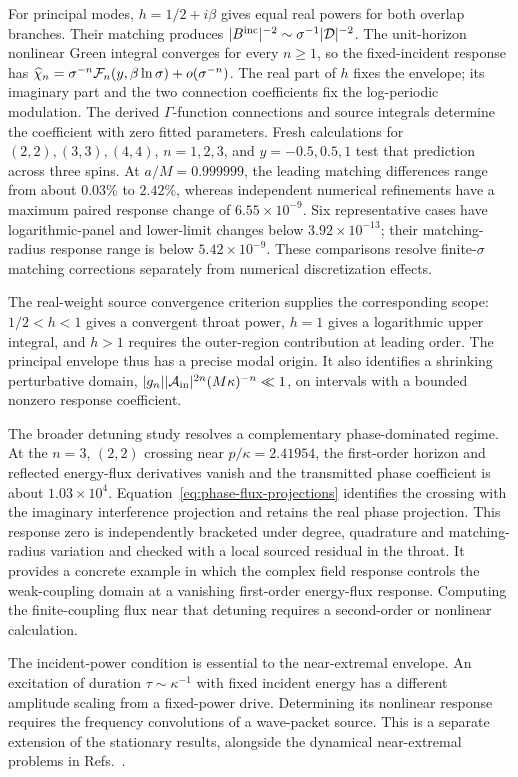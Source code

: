 \documentclass[aps,prd,twocolumn,10pt,nofootinbib,superscriptaddress,floatfix]{revtex4-2}
\begin{document}
For principal modes, $h=1/2+i\beta$ gives equal real powers for both overlap
branches.  Their matching produces $|B^{\rm inc}|^{-2}\sim\sigma^{-1}
|{\cal D}|^{-2}$.  The unit-horizon nonlinear Green integral converges for
every $n\ge1$, so the fixed-incident response has
$\widehat\chi_n=\sigma^{-n}{\cal F}_n(y,\beta\ln\sigma)+o(\sigma^{-n})$.
The real part of $h$ fixes the envelope; its imaginary part and the two
connection coefficients fix the log-periodic modulation.  The derived
$\Gamma$-function connections and source integrals determine the coefficient
with zero fitted parameters.  Fresh calculations for $(2,2),(3,3),(4,4)$,
$n=1,2,3$, and $y=-0.5,0.5,1$ test that prediction across three spins.
At $a/M=0.999999$, the leading matching differences range from about
$0.03\%$ to $2.42\%$, whereas independent numerical refinements have a
maximum paired response change of $6.55\times10^{-9}$.
Six representative cases have logarithmic-panel and lower-limit changes
below $3.92\times10^{-13}$; their matching-radius response range is below
$5.42\times10^{-9}$.  These comparisons resolve finite-$\sigma$
matching corrections separately from numerical discretization effects.

The real-weight source convergence criterion supplies the corresponding
scope: $1/2<h<1$ gives a convergent throat power, $h=1$ gives a logarithmic
upper integral, and $h>1$ requires the outer-region contribution at leading
order.  The principal envelope thus has a precise modal origin.  It also
identifies a shrinking perturbative domain,
$|g_n||{\cal A}_{\rm in}|^{2n}(M\kappa)^{-n}\ll1$, on intervals with
a bounded nonzero response coefficient.

The broader detuning study resolves a complementary phase-dominated regime.
At the $n=3$, $(2,2)$ crossing near $p/\kappa=2.41954$,
the first-order horizon and reflected energy-flux derivatives vanish
and the transmitted phase coefficient is about $1.03\times10^4$.
Equation~\eqref{eq:phase-flux-projections} identifies the crossing with
the imaginary interference projection and retains the real phase
projection.  This response zero is independently bracketed under degree,
quadrature and matching-radius variation and checked with a local sourced
residual in the throat.  It provides a concrete example in which the
complex field response controls the weak-coupling domain at a vanishing
first-order energy-flux response.  Computing the finite-coupling flux
near that detuning requires a second-order or nonlinear calculation.

The incident-power condition is essential to the near-extremal envelope.
An excitation of duration $\tau\sim\kappa^{-1}$ with fixed incident
energy has a different amplitude scaling from a fixed-power drive.
Determining its nonlinear response requires the frequency convolutions
of a wave-packet source.  This is a separate extension of the stationary
results, alongside the dynamical near-extremal problems in
Refs.~\cite{GrallaTransient2016,GrallaCritical2018,IulianoWeather2025}.
\end{document}
